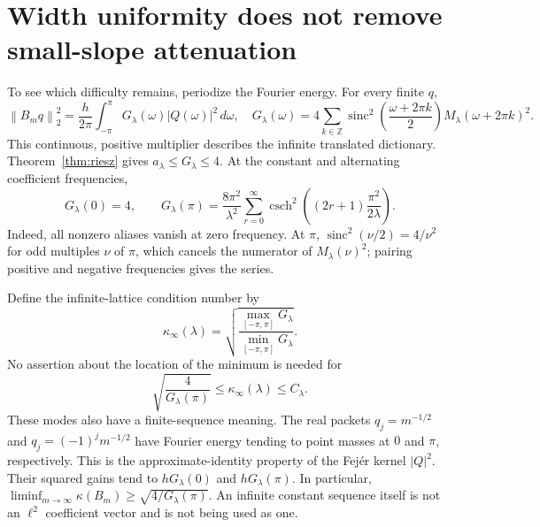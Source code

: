 \documentclass[11pt]{article}
\theoremstyle{remark}
\newcommand{\Z}{\mathbb Z}
\newcommand{\csch}{\operatorname{csch}}
\newcommand{\sinc}{\operatorname{sinc}}
\newcommand{\norm}[1]{\left\lVert #1\right\rVert}
\begin{document}
\section{Width uniformity does not remove small-slope attenuation}

To see which difficulty remains, periodize the Fourier energy.
For every finite $q$,
\begin{equation}\label{eq:gramian}
 \norm{B_mq}_2^2=\frac h{2\pi}\int_{-\pi}^{\pi}
 G_\lambda(\omega)|Q(\omega)|^2\,d\omega,
 \quad
 G_\lambda(\omega)=4\sum_{k\in\Z}
 \sinc^2\!\left(\frac{\omega+2\pi k}{2}\right)
 M_\lambda(\omega+2\pi k)^2.
\end{equation}
This continuous, positive multiplier describes the infinite translated
dictionary.  Theorem~\ref{thm:riesz} gives
$a_\lambda\le G_\lambda\le4$.  At the constant and alternating
coefficient frequencies,
\begin{equation}\label{eq:twofreq}
 G_\lambda(0)=4,
 \qquad
 G_\lambda(\pi)=\frac{8\pi^2}{\lambda^2}
 \sum_{r=0}^{\infty}
 \csch^2\!\left((2r+1)\frac{\pi^2}{2\lambda}\right).
\end{equation}
Indeed, all nonzero aliases vanish at zero frequency.  At $\pi$,
$\sinc^2(\nu/2)=4/\nu^2$ for odd multiples $\nu$ of $\pi$, which
cancels the numerator of $M_\lambda(\nu)^2$; pairing positive and
negative frequencies gives the series.

Define the infinite-lattice condition number by
\[
 \kappa_\infty(\lambda)
 =\sqrt{\frac{\max_{[-\pi,\pi]}G_\lambda}
 {\min_{[-\pi,\pi]}G_\lambda}}.
\]
No assertion about the location of the minimum is needed for
\begin{equation}\label{eq:infinitebounds}
 \sqrt{\frac4{G_\lambda(\pi)}}
 \le\kappa_\infty(\lambda)\le C_\lambda.
\end{equation}
These modes also have a finite-sequence meaning.  The real packets
$q_j=m^{-1/2}$ and $q_j=(-1)^jm^{-1/2}$ have Fourier energy tending
to point masses at $0$ and $\pi$, respectively.  This is the
approximate-identity property of the Fej\'er kernel $|Q|^2$.
Their squared gains tend to $hG_\lambda(0)$ and $hG_\lambda(\pi)$.
In particular,
$\liminf_{m\to\infty}\kappa(B_m)\ge\sqrt{4/G_\lambda(\pi)}$.
An infinite constant sequence itself is not an $\ell^2$ coefficient
vector and is not being used as one.
\end{document}
